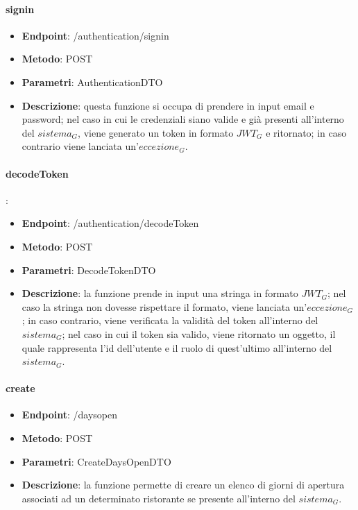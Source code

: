 \paragraph{signin}

\begin{itemize}
    \item \textbf{Endpoint}: /authentication/signin
    \item \textbf{Metodo}: POST
    \item \textbf{Parametri}: AuthenticationDTO
    \item \textbf{Descrizione}: questa funzione si occupa di prendere in input email e password; nel caso in cui le credenziali siano valide e già presenti all'interno del $\textit{sistema}_G$, viene generato un token in formato $\textit{JWT}_G$ e ritornato; in caso contrario viene lanciata un'$\textit{eccezione}_G$.
\end{itemize}

\paragraph{decodeToken}: 

\begin{itemize}
    \item \textbf{Endpoint}: /authentication/decodeToken
    \item \textbf{Metodo}: POST
    \item \textbf{Parametri}: DecodeTokenDTO
    \item \textbf{Descrizione}: la funzione prende in input una stringa in formato $\textit{JWT}_G$; nel caso la stringa non dovesse rispettare il formato, viene lanciata un'$\textit{eccezione}_G$; in caso contrario, viene verificata la validità del token all'interno del $\textit{sistema}_G$; nel caso in cui il token sia valido, viene ritornato un oggetto, il quale rappresenta l'id dell'utente e il ruolo di quest'ultimo all'interno del $\textit{sistema}_G$.
\end{itemize}


\paragraph{create}
\begin{itemize}
    \item \textbf{Endpoint}: /daysopen
    \item \textbf{Metodo}: POST
    \item \textbf{Parametri}: CreateDaysOpenDTO
    \item \textbf{Descrizione}: la funzione permette di creare un elenco di giorni di apertura associati ad un determinato ristorante se presente all'interno del $\textit{sistema}_G$.
\end{itemize}


